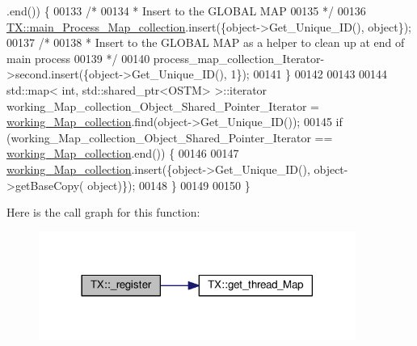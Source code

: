 \begin{DoxyCode}
      .end()) \{
00133         \textcolor{comment}{/*}
00134 \textcolor{comment}{         * Insert to the GLOBAL MAP 
}
00135 \textcolor{comment}{         */}
00136         \hyperlink{class_t_x_a1a45d726894190695314464d7cd97c29_a1a45d726894190695314464d7cd97c29}{TX::main\_Process\_Map\_collection}.insert(\{\textcolor{keywordtype}{object}->Get\_Unique\_ID(), \textcolor{keywordtype}{
      object}\});
00137         \textcolor{comment}{/*}
00138 \textcolor{comment}{         * Insert to the GLOBAL MAP as a helper to clean up at end of main process 
}
00139 \textcolor{comment}{         */}
00140         process\_map\_collection\_Iterator->second.insert(\{\textcolor{keywordtype}{object}->Get\_Unique\_ID(), 1\});
00141     \} 
00142 
00143 
00144     std::map< int, std::shared\_ptr<OSTM> >::iterator working\_Map\_collection\_Object\_Shared\_Pointer\_Iterator 
      = \hyperlink{class_t_x_a81aafda16e2f20e36ec6c68e584668ff_a81aafda16e2f20e36ec6c68e584668ff}{working\_Map\_collection}.find(object->Get\_Unique\_ID());
00145     \textcolor{keywordflow}{if} (working\_Map\_collection\_Object\_Shared\_Pointer\_Iterator == 
      \hyperlink{class_t_x_a81aafda16e2f20e36ec6c68e584668ff_a81aafda16e2f20e36ec6c68e584668ff}{working\_Map\_collection}.end()) \{
00146 
00147         \hyperlink{class_t_x_a81aafda16e2f20e36ec6c68e584668ff_a81aafda16e2f20e36ec6c68e584668ff}{working\_Map\_collection}.insert(\{\textcolor{keywordtype}{object}->Get\_Unique\_ID(), \textcolor{keywordtype}{object}->getBaseCopy(\textcolor{keywordtype}{
      object})\});
00148     \}
00149 
00150 \}
\end{DoxyCode}


Here is the call graph for this function\+:\nopagebreak
\begin{figure}[H]
\begin{center}
\leavevmode
\includegraphics[width=294pt]{class_t_x_abc32af2f51df97ac483e5bfe7db6ca6e_abc32af2f51df97ac483e5bfe7db6ca6e_cgraph}
\end{center}
\end{figure}


